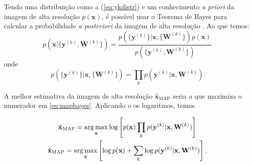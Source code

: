 Tendo uma distribuição como a (\ref{eq:ykdistr}) e um conhecimento \emph{a priori} da imagem de alta resolução $p(\mathbf{x})$, é possível usar o Teorema de Bayes para calcular a probabilidade \emph{a posteriori} da imagem de alta resolução \cite{nasrollahi2014super,pickup2007bayesian,pickup2007bayesian2} . Ao que temos:
\begin{equation}
	\label{eq:mapbayes}
	p(\mathbf{x} | \{\mathbf{y}^{(k)}, \mathbf{W}^{(k)}\}) = \frac{p(\{\mathbf{y}^{(k)}\} | \mathbf{x}, \{\mathbf{W}^{(k)}\}) p(\mathbf{x})}
	{p(\{\mathbf{y}^{(k)}, \mathbf{W}^{(k)}\})}
\end{equation}
onde
\begin{equation}
	p(\{\mathbf{y}^{(k)}\} | \mathbf{x}, \{\mathbf{W}^{(k)}\}) = 
	\prod_k p(\mathbf{y}^{(k)} | \mathbf{x}, \mathbf{W}^{(k)})
\end{equation}

A melhor estimativa da imagem de alta resolução $\hat{\mathbf{x}}_{\mathrm{MAP}}$ seria a que maximiza o numerador em \ref{eq:mapbayes}. 
Aplicando o os logaritmos, temos

\begin{gather}
	\hat{\mathbf{x}}_{\mathrm{MAP}} = \operatorname*{arg\,max}_{\mathbf{x}} \log \left[ p(\mathbf{x}) \prod_k p(\mathbf{y}^{(k)} | \mathbf{x}, \mathbf{W}^{(k)}) \right] \\
	\hat{\mathbf{x}}_{\mathrm{MAP}} = \operatorname*{arg\,max}_{\mathbf{x}} \left[ \log p(\mathbf{x}) + \sum_k \log p(\mathbf{y}^{(k)} | \mathbf{x}, \mathbf{W}^{(k)}) \right].
\end{gather}



